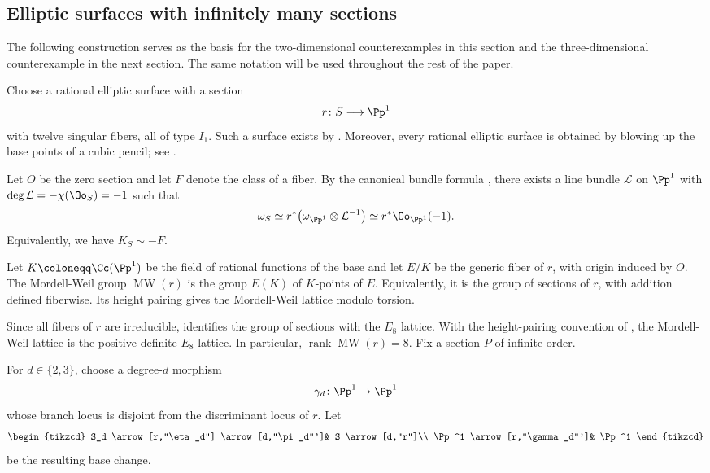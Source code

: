 \documentclass[12pt]{amsart}
\newcommand{\MW}{\operatorname{MW}}
\begin{document}
\subsection{Elliptic surfaces with infinitely many sections}\label{subsec: elliptic surfaces}

  The following construction serves as the basis for the two-dimensional
counterexamples in this section and the three-dimensional counterexample
in the next section. The same notation will be used throughout the rest of the paper.

Choose a rational elliptic surface with a section
\[
r\colon S\longrightarrow\Pp^1
\]
with twelve singular fibers, all of type \(I_1\). Such a surface exists by
\cite[Corollary~10.3]{SS10}. Moreover, every rational elliptic surface is
obtained by blowing up the base points of a cubic pencil; see
\cite[Proposition~8.1]{SS10}.

Let \(O\) be the zero section and let \(F\) denote the class of a fiber.
By the canonical bundle formula
\cite[Theorem~6.8]{SS10}, there exists a line bundle
\(\mathcal L\) on \(\Pp^1\) with
\(\deg\mathcal L=-\chi(\Oo_S)=-1\) such that
\begin{equation}\label{eq:canonical-rational-elliptic}
\omega_S
\simeq
r^*\bigl(\omega_{\Pp^1}\otimes\mathcal L^{-1}\bigr)\simeq r^*\Oo_{\Pp^1}(-1).
\end{equation}
Equivalently, we have \(K_S\sim-F\).

Let $K\coloneqq\Cc(\Pp^1)$ be the field of rational functions of the base and let $E/K$ be the generic fiber of $r$, with origin induced by $O$. The Mordell-Weil group $\MW(r)$ is the group $E(K)$ of $K$-points of $E$. Equivalently, it is the group of sections of $r$, with addition defined fiberwise. Its height pairing gives the Mordell-Weil lattice modulo torsion.

Since all fibers of \(r\) are irreducible, \cite[Corollary~8.4]{SS10} identifies the group of sections with the $E_8$ lattice. With the height-pairing convention of \cite[\S~11.7]{SS10}, the Mordell-Weil lattice is the positive-definite $E_8$ lattice. In particular,
$
\operatorname{rank}\MW(r)=8.
$
Fix a section \(P\) of infinite order.

For $d\in\{2,3\}$, choose a degree-$d$ morphism
\[
 \gamma_d\colon\Pp^1\to\Pp^1
\]
whose branch locus is disjoint from the discriminant locus of $r$. Let
\[
\begin{tikzcd}
S_d \arrow[r,"\eta_d"] \arrow[d,"\pi_d"']&
S \arrow[d,"r"]\\
\Pp^1 \arrow[r,"\gamma_d"']&
\Pp^1
\end{tikzcd}
\]
be the resulting base change.
\end{document}
